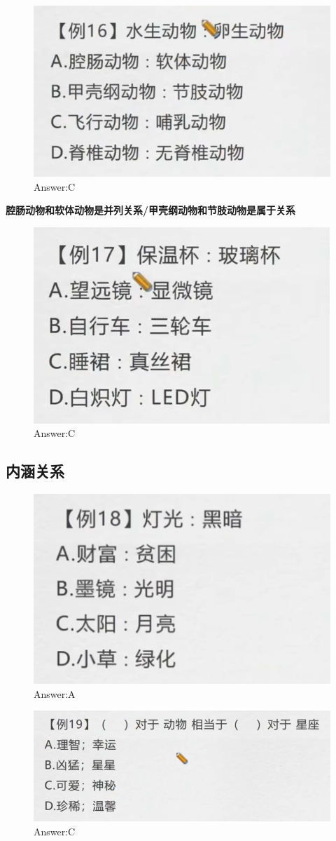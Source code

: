 \documentclass{article}
\numberwithin{equation}{section}						%
\numberwithin{figure}{section}							%
\begin{document}
\begin{sloppypar}
\begin{figure}[H]
     \centering
     \includegraphics[width=0.4\linewidth]{116.png}
		\caption{Answer:C}
\end{figure}

\textbf{腔肠动物和软体动物是并列关系/甲壳纲动物和节肢动物是属于关系}

\begin{figure}[H]
     \centering
     \includegraphics[width=0.4\linewidth]{117.png}
		\caption{Answer:C}
\end{figure}


\subsection{内涵关系}



\begin{figure}[H]
     \centering
     \includegraphics[width=0.4\linewidth]{118.png}
		\caption{Answer:A}
\end{figure}


\begin{figure}[H]
     \centering
     \includegraphics[width=0.4\linewidth]{119.png}
		\caption{Answer:C}
\end{figure}



\end{sloppypar}
\end{document}

